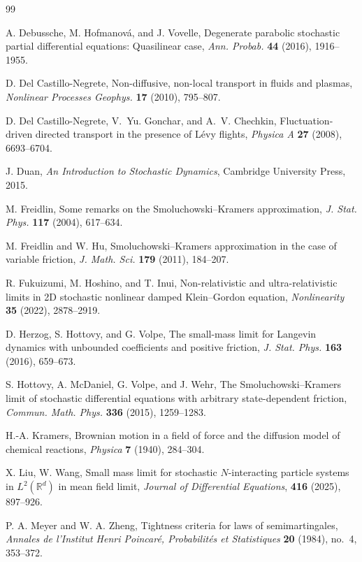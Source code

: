 \documentclass[11pt]{article}
\theoremstyle{plain}
\numberwithin{equation}{section}
\begin{document}
\begin{thebibliography}{99}
 

A. Debussche, M. Hofmanov\'a, and J. Vovelle,
Degenerate parabolic stochastic partial differential equations: Quasilinear case,
\emph{Ann. Probab.} \textbf{44} (2016), 1916--1955.

D. Del Castillo-Negrete,
Non-diffusive, non-local transport in fluids and plasmas,
\emph{Nonlinear Processes Geophys.} \textbf{17} (2010), 795--807.

D. Del Castillo-Negrete, V.~Yu. Gonchar, and A.~V. Chechkin,
Fluctuation-driven directed transport in the presence of L\'evy flights,
\emph{Physica A} \textbf{27} (2008), 6693--6704.

 
J. Duan,
\emph{An Introduction to Stochastic Dynamics},
Cambridge University Press, 2015.

 

M. Freidlin,
Some remarks on the Smoluchowski--Kramers approximation,
\emph{J. Stat. Phys.} \textbf{117} (2004), 617--634.

M. Freidlin and W. Hu,
Smoluchowski--Kramers approximation in the case of variable friction,
\emph{J. Math. Sci.} \textbf{179} (2011), 184--207.

R. Fukuizumi, M. Hoshino, and T. Inui,
Non-relativistic and ultra-relativistic limits in 2D stochastic nonlinear damped Klein--Gordon equation,
\emph{Nonlinearity} \textbf{35} (2022), 2878--2919.
 

D. Herzog, S. Hottovy, and G. Volpe,
The small-mass limit for Langevin dynamics with unbounded coefficients and positive friction,
\emph{J. Stat. Phys.} \textbf{163} (2016), 659--673.

S. Hottovy, A. McDaniel, G. Volpe, and J. Wehr,
The Smoluchowski--Kramers limit of stochastic differential equations with arbitrary state-dependent friction,
\emph{Commun. Math. Phys.} \textbf{336} (2015), 1259--1283.

 
H.-A. Kramers,
Brownian motion in a field of force and the diffusion model of chemical reactions,
\emph{Physica} \textbf{7} (1940), 284--304.

 X. Liu, W. Wang, 
  Small mass limit for stochastic $N$-interacting particle systems in $L^2(\mathbb{R}^d)$ in mean field limit, 
  \emph{Journal of Differential Equations}, {\bf 416} (2025), 897--926.


P. A. Meyer and W. A. Zheng,
Tightness criteria for laws of semimartingales,
\emph{Annales de l'Institut Henri Poincaré, Probabilités et Statistiques}
\textbf{20} (1984), no.~4, 353--372.


\end{thebibliography}
\end{document}
